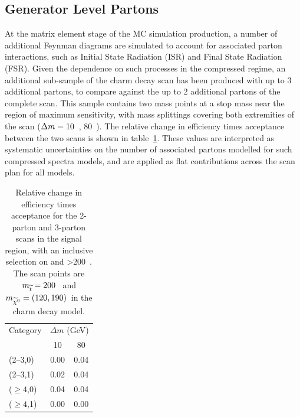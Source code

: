 
\subsection{Generator Level Partons}
At the \MADGRAPH matrix element stage of the MC simulation production, a number
of additional Feynman diagrams are simulated to account for associated parton 
interactions, such as Initial State Radiation (ISR) and Final State Radiation
(FSR). Given the dependence on such processes in the
compressed regime, an additional sub-sample of the charm decay scan 
has been produced with up to 3 additional partons, to compare against the up to
2 additional partons of the complete scan. This sample contains two mass points 
at a stop mass near the region of maximum sensitivity, with mass splittings 
covering both extremities of the scan ($\Delta m = 10$~\gev, 80~\gev). The relative
change in efficiency times 
acceptance between the two scans is shown in table~\ref{tab:sms-t2cc-2v3part}. 
These values are interpreted as systematic uncertainties on the number of 
associated partons modelled for such compressed spectra models, and are applied 
as flat contributions across the scan plan for all models.

\begin{table}[!h]
  \caption{Relative change in efficiency times acceptance for the
    2-parton and 3-parton scans in the signal region, with an inclusive 
    selection on \nb and \HT>200~\gev. The scan points are $m_{\widetilde{t}} = 200$~\gev 
    and $m_{\widetilde{\chi}^{0}} = (120, 190)$~\gev in the charm decay model.}
  \label{tab:sms-t2cc-2v3part}
  \centering
  \small
  \begin{tabular}{ lcc }
    \hline
    \hline
    Category     & \multicolumn{2}{c}{$\Delta m$ (GeV)} \\
    \cline{2-3}
                 & 10   & 80                            \\
    \hline
    (2--3,0)     & 0.00 & 0.04                          \\
    (2--3,1)     & 0.02 & 0.04                          \\
    ($\geq 4$,0) & 0.04 & 0.04                          \\
    ($\geq 4$,1) & 0.00 & 0.00                          \\
    \hline
    \hline
  \end{tabular}
\end{table}

